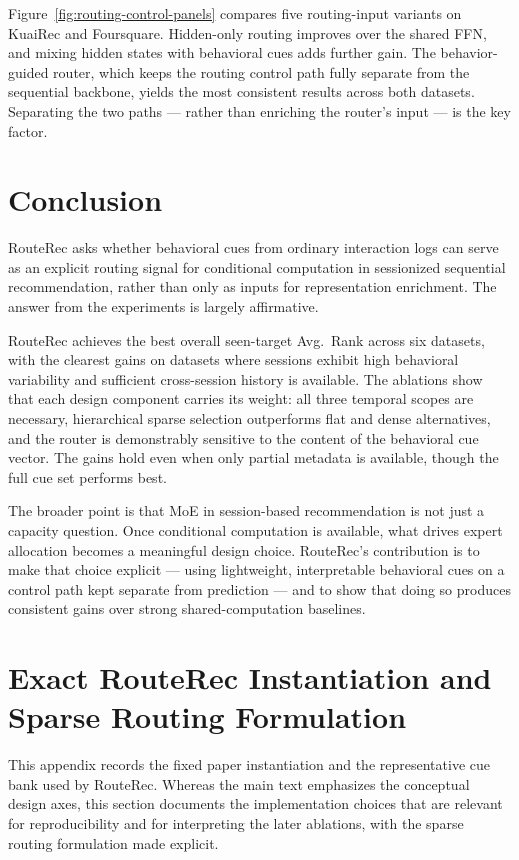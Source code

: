 \documentclass[sigconf,review,anonymous]{acmart}
\begin{document}
Figure~\ref{fig:routing-control-panels} compares five routing-input variants on KuaiRec and Foursquare. Hidden-only routing improves over the shared FFN, and mixing hidden states with behavioral cues adds further gain. The behavior-guided router, which keeps the routing control path fully separate from the sequential backbone, yields the most consistent results across both datasets. Separating the two paths --- rather than enriching the router's input --- is the key factor.

\section{Conclusion}
\label{sec:conclusion}
RouteRec asks whether behavioral cues from ordinary interaction logs can serve as an explicit routing signal for conditional computation in sessionized sequential recommendation, rather than only as inputs for representation enrichment. The answer from the experiments is largely affirmative.

RouteRec achieves the best overall seen-target Avg.~Rank across six datasets, with the clearest gains on datasets where sessions exhibit high behavioral variability and sufficient cross-session history is available. The ablations show that each design component carries its weight: all three temporal scopes are necessary, hierarchical sparse selection outperforms flat and dense alternatives, and the router is demonstrably sensitive to the content of the behavioral cue vector. The gains hold even when only partial metadata is available, though the full cue set performs best.

The broader point is that MoE in session-based recommendation is not just a capacity question. Once conditional computation is available, what drives expert allocation becomes a meaningful design choice. RouteRec's contribution is to make that choice explicit --- using lightweight, interpretable behavioral cues on a control path kept separate from prediction --- and to show that doing so produces consistent gains over strong shared-computation baselines.

\clearpage
\balance



\clearpage
\appendix

\section{Exact RouteRec Instantiation and Sparse Routing Formulation}
\label{app:method-details}
This appendix records the fixed paper instantiation and the representative cue bank used by RouteRec. Whereas the main text emphasizes the conceptual design axes, this section documents the implementation choices that are relevant for reproducibility and for interpreting the later ablations, with the sparse routing formulation made explicit.
\end{document}
